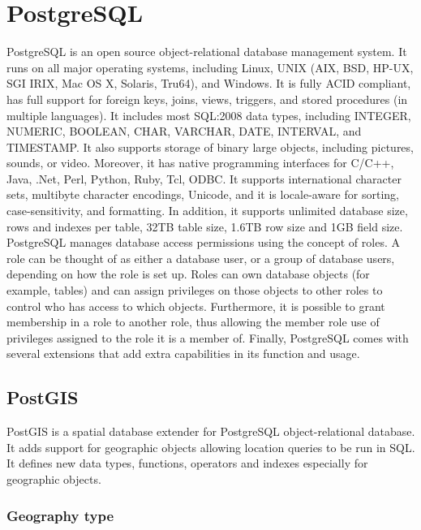 \section{PostgreSQL}

PostgreSQL \cite{11} is an open source object-relational database management system. It runs on all major operating systems, including Linux, UNIX (AIX, BSD, HP-UX, 
SGI IRIX, Mac OS X, Solaris, Tru64), and Windows. It is fully ACID compliant, has full support for foreign keys, joins, views, triggers, and stored procedures 
(in multiple languages). It includes most SQL:2008 data types, including INTEGER, NUMERIC, BOOLEAN, CHAR, VARCHAR, DATE, INTERVAL, and TIMESTAMP. It also supports 
storage of binary large objects, including pictures, sounds, or video. Moreover, it has native programming interfaces for C/C++, Java, .Net, Perl, Python, Ruby, Tcl, ODBC. 
It supports international character sets, multibyte character encodings, Unicode, and it is locale-aware for sorting, case-sensitivity, and formatting. 
In addition, it supports unlimited database size, rows and indexes per table, 32TB table size, 1.6TB row size and 1GB field size. PostgreSQL manages 
database access permissions using the concept of roles. A role can be thought of as either a database user, or a group of database users, depending on how 
the role is set up. Roles can own database objects (for example, tables) and can assign privileges on those objects to other roles to control 
who has access to which objects. Furthermore, it is possible to grant membership in a role to another role, thus allowing the member role use of privileges 
assigned to the role it is a member of. Finally, PostgreSQL comes with several extensions that add extra capabilities in its function and usage. 

\subsection{PostGIS}

PostGIS \cite{12} is a spatial database extender for PostgreSQL object-relational database. It adds support for geographic objects allowing location queries 
to be run in SQL. It defines new data types, functions, operators and indexes especially for geographic objects. 

\subsubsection{Geography type}

